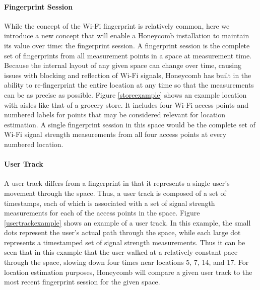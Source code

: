 \paragraph{Fingerprint Session}

While the concept of the Wi-Fi fingerprint is relatively common, here we introduce a new concept that will enable a Honeycomb installation to maintain its value over time: the fingerprint session. A fingerprint session is the complete set of fingerprints from all measurement points in a space at measurement time. Because the internal layout of any given space can change over time, causing issues with blocking and reflection of Wi-Fi signals, Honeycomb has built in the ability to re-fingerprint the entire location at any time so that the measurements can be as precise as possible. Figure \ref{storeexample} shows an example location with aisles like that of a grocery store. It includes four Wi-Fi access points and numbered labels for points that may be considered relevant for location estimation. A single fingerprint session in this space would be the complete set of Wi-Fi signal strength measurements from all four access points at every numbered location. 


\paragraph{User Track}
A user track differs from a fingerprint in that it represents a single user's movement through the space. Thus, a user track is composed of a set of timestamps, each of which is associated with a set of signal strength measurements for each of the access points in the space. Figure \ref{usertrackexample} shows an example of a user track. In this example, the small dots represent the user's actual path through the space, while each large dot represents a timestamped set of signal strength measurements. Thus it can be seen that in this example that the user walked at a relatively constant pace through the space, slowing down four times near locations 5, 7, 14, and 17. For location estimation purposes, Honeycomb will compare a given user track to the most recent fingerprint session for the given space. 


